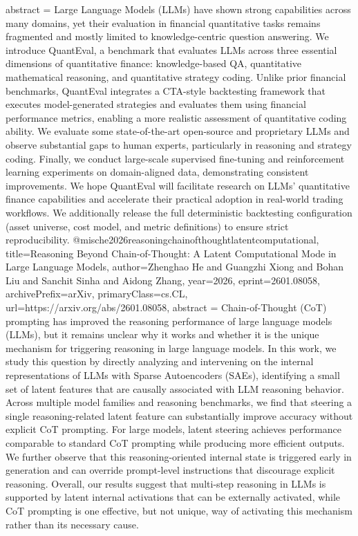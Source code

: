 {      abstract = {Large Language Models (LLMs) have shown strong capabilities across many domains, yet their evaluation in financial quantitative tasks remains fragmented and mostly limited to knowledge-centric question answering. We introduce QuantEval, a benchmark that evaluates LLMs across three essential dimensions of quantitative finance: knowledge-based QA, quantitative mathematical reasoning, and quantitative strategy coding. Unlike prior financial benchmarks, QuantEval integrates a CTA-style backtesting framework that executes model-generated strategies and evaluates them using financial performance metrics, enabling a more realistic assessment of quantitative coding ability. We evaluate some state-of-the-art open-source and proprietary LLMs and observe substantial gaps to human experts, particularly in reasoning and strategy coding. Finally, we conduct large-scale supervised fine-tuning and reinforcement learning experiments on domain-aligned data, demonstrating consistent improvements. We hope QuantEval will facilitate research on LLMs' quantitative finance capabilities and accelerate their practical adoption in real-world trading workflows. We additionally release the full deterministic backtesting configuration (asset universe, cost model, and metric definitions) to ensure strict reproducibility.}
}@misc{he2026reasoningchainofthoughtlatentcomputational,
      title={Reasoning Beyond Chain-of-Thought: A Latent Computational Mode in Large Language Models}, 
      author={Zhenghao He and Guangzhi Xiong and Bohan Liu and Sanchit Sinha and Aidong Zhang},
      year={2026},
      eprint={2601.08058},
      archivePrefix={arXiv},
      primaryClass={cs.CL},
      url={https://arxiv.org/abs/2601.08058},
      abstract = {Chain-of-Thought (CoT) prompting has improved the reasoning performance of large language models (LLMs), but it remains unclear why it works and whether it is the unique mechanism for triggering reasoning in large language models. In this work, we study this question by directly analyzing and intervening on the internal representations of LLMs with Sparse Autoencoders (SAEs), identifying a small set of latent features that are causally associated with LLM reasoning behavior. Across multiple model families and reasoning benchmarks, we find that steering a single reasoning-related latent feature can substantially improve accuracy without explicit CoT prompting. For large models, latent steering achieves performance comparable to standard CoT prompting while producing more efficient outputs. We further observe that this reasoning-oriented internal state is triggered early in generation and can override prompt-level instructions that discourage explicit reasoning. Overall, our results suggest that multi-step reasoning in LLMs is supported by latent internal activations that can be externally activated, while CoT prompting is one effective, but not unique, way of activating this mechanism rather than its necessary cause.}
}
